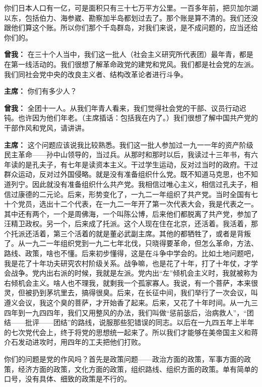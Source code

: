 \begin{list}{}
你们日本人口有一亿，可是面积只有三十七万平方公里。一百多年前，把贝加尔湖以东，包括伯力、海参崴、勘察加半岛都划过去了。那个账是算不清的。我们还没跟他们算这个账。所以你们那个千岛群岛，对我们来说，是不成问题的，应当还给你们的。

\item[\textbf{曾我：}] 在三十个人当中，我们这一批人（社会主义研究所代表团）最年青，都是在第一线活动的。我们很想了解革命政党的建党和党风。我们都是社会党的左派。我们同社会党中央的改良主义者、结构改革论者进行斗争。

\item[\textbf{主席：}] 你们有多少人？

\item[\textbf{曾我：}] 全团十一人。从我们年青人看来，我们觉得社会党的干部、议员行动迟钝。也许因为他们年老。（主席插话：包括我在内了。）我们很想了解中国共产党的干部作风和党风，请讲讲。

\item[\textbf{主席：}] 这个问题应该说我比较熟悉。我们这一批人参加过一九一一年的资产阶级民主革命——孙中山领导的，当过兵。从那时和那时以后，我读过十三年书，有六年读的是孔夫子，有七年是读资本主义。干过学生运动，反对过当时的政府。干过群众运动，反对过外国侵略。就是没有准备组织什么党。既不知道马克思，也不知道列宁。因此就没有准备组织什么共产党。我相信过唯心主义，相信过孔夫子，相信过康德的二元论。后来，形势变化了，一九二一年组织了共产党。当时全国有七十个党员，选出十二个代表，在一九二一年开了第一次代表大会，我是代表之一。其中还有两个，一个是周佛海，一个叫陈公博，后来他们都脱离了共产党，参加了汪精卫政权。另一个，后来成了托派。这个人现在住在北京，还活着。我活着，那个托派还活着，第三个活着的就是董必武副主席。其他的都牺牲了，或者是背叛了。从一九二一年组织党到一九二七年北伐，只晓得要革命，但怎么革命，方法、路线、政策，啥也不懂。后来初步懂得，这是在斗争中学会的。比如土地问题吧，我是花了十年功夫研究农村阶级关系。战争嘛，也是花了十年，打了十年仗，才学会战争。党内出右派的时候，我就是左派。党内出“左”倾机会主义时，我就被称为右倾机会主义。啥人也不理我，就剩我一个孤家寡人。我说，有一个菩萨，本来很灵，但被扔到茅坑里去，搞得很臭。后来，在长征中间，我们举行了一次会议，叫遵义会议，我这个臭的菩萨，才开始香了起来。后来，又花了十年时间。从一九三四年到一九四四年，我们又用整风的办法，我们叫做“惩前毖后，治病救人”，“团结——批评——团结”的路线，说服那些犯错误的同志。以后在一九四五年上半年的七次党代会上，终于将党的思想统一起来了。所以我们才能够在美帝国主义和蒋介石发动进攻时，用四年的工夫把他们打败。

你们的问题是党的作风吗？首先是政策问题——政治方面的政策，军事方面的政策，经济方面的政策，文化方面的政策，组织路线、组织方面的政策。单有简单的口号，没有具体、细致的政策是不行的。


\end{list}
